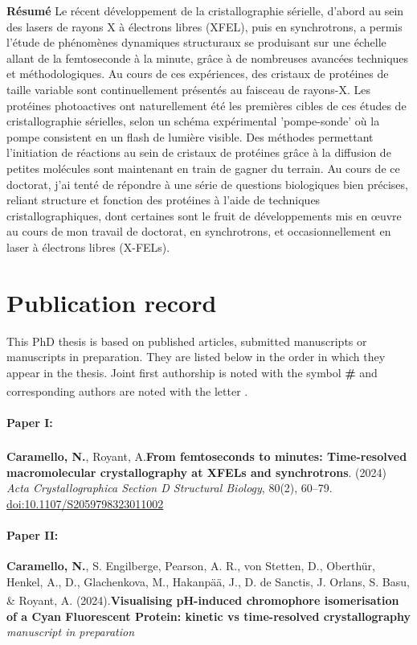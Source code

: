 \documentclass{report}
\renewcommand{\normalsize}{\fontsize{11}{12}\selectfont} %
\begin{document}
% 

\LARGE\textbf{Résumé}
\normalsize Le récent développement de la cristallographie sérielle, d'abord au sein des lasers de rayons X à électrons libres (XFEL), puis en synchrotrons, a permis l'étude de phénomènes dynamiques structuraux se produisant sur une échelle allant de la femtoseconde à la minute, grâce à de nombreuses avancées techniques et méthodologiques. Au cours de ces expériences, des cristaux de protéines de taille variable sont continuellement présentés au faisceau de rayons-X. Les protéines photoactives ont naturellement été les premières cibles de ces études de cristallographie sérielles, selon un schéma expérimental 'pompe-sonde' où la pompe consistent en un flash de lumière visible. Des méthodes permettant l’initiation de réactions au sein de cristaux de protéines grâce à la diffusion de petites molécules sont maintenant en train de gagner du terrain. Au cours de ce doctorat, j’ai tenté de répondre à une série de questions biologiques bien précises, reliant structure et fonction des protéines à l’aide de techniques cristallographiques, dont certaines sont le fruit de développements mis en œuvre au cours de mon travail de doctorat, en synchrotrons, et occasionnellement en laser à électrons libres (X-FELs). 

\pagebreak

\section*{Publication record}
This PhD thesis is based on published articles, submitted manuscripts or manuscripts in preparation. They are listed below in the order in which they appear in the thesis. Joint first authorship is noted with the symbol \textbf{\#} and corresponding authors are noted with the letter \textsuperscript{\textbf{\textalpha}}. 

\paragraph{Paper I:} \textbf{Caramello, N.},  Royant, A.\textsuperscript{\textbf{\textalpha}}\textbf{From femtoseconds to minutes: Time-resolved macromolecular crystallography at XFELs and synchrotrons}. (2024) \textit{Acta Crystallographica Section D Structural Biology}, 80(2), 60–79. \url{doi:10.1107/S2059798323011002}

\paragraph{Paper II:} \textbf{Caramello, N.}, S. Engilberge, Pearson, A. R., von Stetten, D., Oberthür, Henkel, A., D., Glachenkova, M., Hakanpää, J., D. de Sanctis, J. Orlans, S. Basu, \& Royant, A.\textsuperscript{\textbf{\textalpha}} (2024).\textbf{Visualising pH-induced chromophore isomerisation of a Cyan Fluorescent Protein: kinetic vs time-resolved crystallography} \textit{manuscript in preparation}
\end{document}
